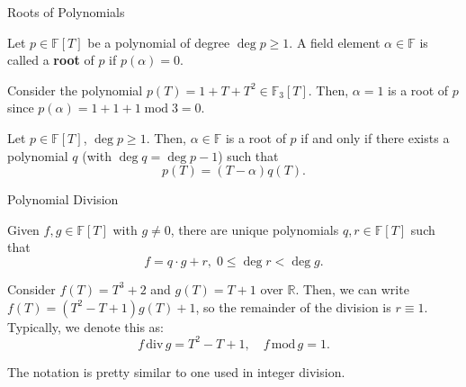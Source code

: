 \documentclass{zkdl-presentation-template}
\begin{document}
    \begin{frame}{Roots of Polynomials}
      \begin{definition}
          Let $p \in \mathbb{F}[T]$ be a polynomial of degree $\deg p \geq 1$. A field element $\alpha \in \mathbb{F}$ is called a \textbf{root} of $p$ if $p(\alpha) = 0$.
      \end{definition}
      \pause

      \begin{example}
          Consider the polynomial $p(T) = 1 + T + T^2 \in \mathbb{F}_3[T]$. Then, $\alpha=1$ is a root of $p$ since $p(\alpha) = 1 + 1 + 1 \; \text{mod} \; 3 = 0$.
      \end{example}
      \pause

      \begin{theorem}
        Let $p \in \mathbb{F}[T]$, $\deg p \geq 1$. Then, $\alpha \in \mathbb{F}$ is a root of $p$ if and only if there exists a polynomial $q$ (with $\deg q = \deg p-1$) such that
        \begin{equation*}
            p(T) = (T-\alpha)q(T).
        \end{equation*}
      \end{theorem}
    \end{frame}

    \begin{frame}{Polynomial Division}
      \begin{theorem}
        Given $f,g \in \mathbb{F}[T]$ with $g \neq 0$, there are unique polynomials $q,r \in \mathbb{F}[T]$ such that
        \begin{equation*}
            f = q \cdot g + r, \; 0 \leq \deg r < \deg g.
        \end{equation*}
      \end{theorem}
      \pause

      \begin{example}
        Consider $f(T) = T^3+2$ and $g(T) = T+1$ over $\mathbb{R}$. Then, we can write $f(T) = (T^2-T+1)g(T) + 1$, so the remainder of the division is $r \equiv 1$. Typically, we denote this as:
        \begin{equation*}
            f \, \text{div} \, g = T^2-T+1, \quad f \, \text{mod} \, g = 1.
        \end{equation*}

        The notation is pretty similar to one used in integer division.
      \end{example}
    \end{frame}
\end{document}
